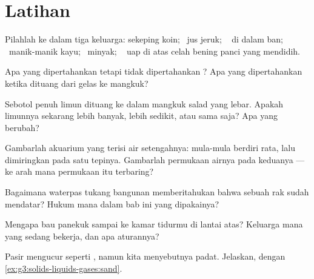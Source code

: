 \section{Latihan}

\begin{exercise}[$\star$]\label{exo:g3:solids-liquids-gases:1}
Pilahlah ke dalam tiga keluarga: sekeping koin; \ jus jeruk; \  di
dalam ban; \ manik-manik kayu; \ minyak; \  uap di atas celah bening
panci yang mendidih.
\end{exercise}

\begin{exercise}[$\star$]\label{exo:g3:solids-liquids-gases:2}
Apa yang dipertahankan  tetapi tidak dipertahankan ?
Apa yang dipertahankan  ketika dituang dari gelas ke mangkuk?
\end{exercise}

\begin{exercise}[$\star$]\label{exo:g3:solids-liquids-gases:3}
Sebotol penuh limun dituang ke dalam mangkuk salad yang lebar. Apakah
limunnya sekarang lebih banyak, lebih sedikit, atau sama saja? Apa
yang berubah?
\end{exercise}

\begin{exercise}[$\star$]\label{exo:g3:solids-liquids-gases:4}
Gambarlah akuarium yang terisi air setengahnya: mula-mula berdiri
rata, lalu dimiringkan pada satu tepinya. Gambarlah permukaan airnya
pada keduanya --- ke arah mana permukaan itu terbaring?
\end{exercise}

\begin{exercise}[$\star$]\label{exo:g3:solids-liquids-gases:5}
Bagaimana waterpas tukang bangunan memberitahukan bahwa sebuah rak
sudah mendatar? Hukum mana dalam bab ini yang dipakainya?
\end{exercise}

\begin{exercise}[$\star$]\label{exo:g3:solids-liquids-gases:6}
Mengapa bau panekuk sampai ke kamar tidurmu di lantai atas? Keluarga
mana yang sedang bekerja, dan apa aturannya?
\end{exercise}

\begin{exercise}[$\star$]\label{exo:g3:solids-liquids-gases:7}
Pasir mengucur seperti , namun kita menyebutnya padat.
Jelaskan, dengan \cref{ex:g3:solids-liquids-gases:sand}.
\end{exercise}

